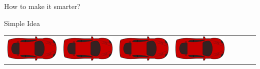 \documentclass{beamer}
\begin{document}
\begin{frame}{How to make it smarter?}
\begin{exampleblock}{Simple Idea}
\begin{tabular}{c|c|c|c|c|c|c|c}
            \includegraphics[scale=0.30]{car.png}&
            \includegraphics[scale=0.30]{car.png}&
            \includegraphics[scale=0.30]{car.png}&
            \includegraphics[scale=0.30]{car.png}


\end{tabular}
\end{exampleblock}
\end{frame}
\end{document}
